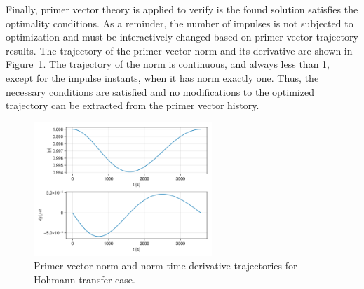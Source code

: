 Finally, primer vector theory is applied to verify is the found solution satisfies the optimality conditions. As a reminder, the number of impulses is not subjected to optimization and must be interactively changed based on primer vector trajectory results. The trajectory of the primer vector norm and its derivative are shown in Figure~\ref{fig:hohmann_primer_vec}. The trajectory of the norm is continuous, and always less than 1, except for the impulse instants, when it has norm exactly one. Thus, the necessary conditions are satisfied and no modifications to the optimized trajectory can be extracted from the primer vector history.

\begin{figure}[htbp]
    \centering
    \includegraphics[width=0.6\textwidth]{img/hohmann_primer_vector_history.png}
    \caption{Primer vector norm and norm time-derivative trajectories for Hohmann transfer case.}
    \label{fig:hohmann_primer_vec}
\end{figure}